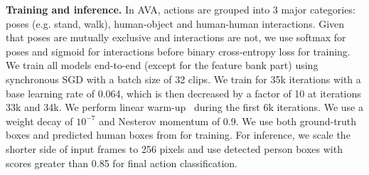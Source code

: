 \vspace{-3mm}
\textbf{\flushleft Training and inference.} 
 In AVA, actions are grouped into 3 major categories: poses (e.g. stand, walk), human-object and human-human interactions. Given that poses are mutually exclusive and interactions are not, we use softmax for poses and sigmoid for interactions before binary cross-entropy loss for training.
We train all models end-to-end (except for
the feature bank part) using synchronous SGD with a batch size of 32 clips.
We train for 35k iterations with a base learning rate of 0.064, which is then decreased by a factor of 10 at iterations 33k and 34k. 
We perform linear warm-up~\cite{goyal2017accurate} during the first 6k iterations. We use a weight decay of $10^{-7}$ and Nesterov momentum of 0.9. 
We use both ground-truth boxes and predicted human boxes from \cite{wu2019long} for training. 
For inference, we scale the shorter side of input frames to 256 pixels and use detected person boxes with scores greater than 0.85 for final action classification.


